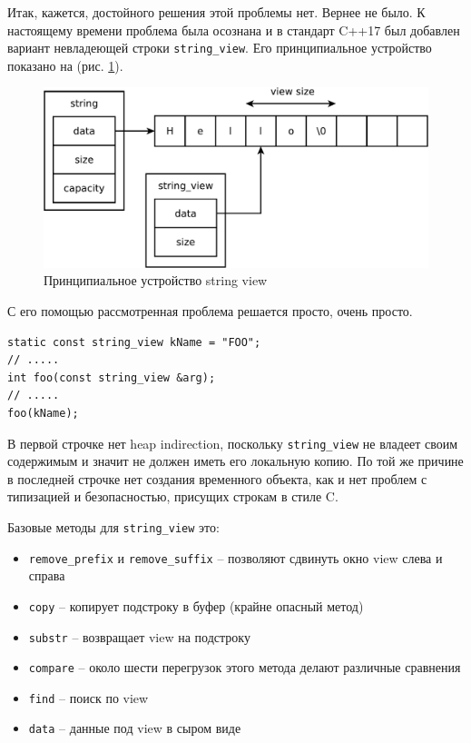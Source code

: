 \documentclass[a4paper,12pt,oneside]{book}
\newif\ifanswers
\begin{document}
\ifanswers
Правильный ответ: общий смех. Если найдётся несчастный, который согласится с тем, что это хорошая идея, его запинают его же одногруппники
\fi

Итак, кажется, достойного решения этой проблемы нет. Вернее не было. К настоящему времени проблема была осознана и в стандарт C++17 был добавлен вариант невладеющей строки \lstinline!string_view!. Его принципиальное устройство показано на (рис. \ref{fig:stringview-principal}).

\begin{figure}[ht]
\centering
\includegraphics[width=1.0\textwidth]{illustrations/stringview-principal-crop.pdf}
\caption{Принципиальное устройство string view}
\label{fig:stringview-principal}
\end{figure}

С его помощью рассмотренная проблема решается просто, очень просто.

\begin{lstlisting}
static const string_view kName = "FOO";
// .....
int foo(const string_view &arg);
// .....
foo(kName);
\end{lstlisting}

В первой строчке нет heap indirection, поскольку \lstinline!string_view! не владеет своим содержимым и значит не должен иметь его локальную копию. По той же причине в последней строчке нет создания временного объекта, как и нет проблем с типизацией и безопасностью, присущих строкам в стиле C.

Базовые методы для \lstinline!string_view! это:

\begin{itemize}
\item \lstinline!remove_prefix! и \lstinline!remove_suffix! -- позволяют сдвинуть окно view слева и справа
\item \lstinline!copy! -- копирует подстроку в буфер (крайне опасный метод)
\item \lstinline!substr! -- возвращает view на подстроку
\item \lstinline!compare! -- около шести перегрузок этого метода делают различные сравнения
\item \lstinline!find! -- поиск по view
\item \lstinline!data! -- данные под view в сыром виде
\end{itemize}
\end{document}
